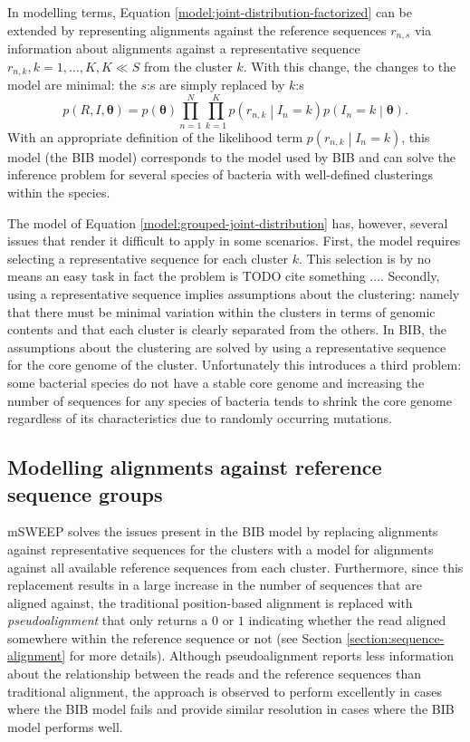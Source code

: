 \documentclass[officiallayout]{tktla}
\begin{document}
In modelling terms, Equation \ref{model:joint-distribution-factorized}
can be extended by representing alignments against the reference
sequences $r_{n, s}$ via information about alignments against a
representative sequence $r_{n, k}, k = 1, \dots, K, K \ll S$ from the
cluster $k$. With this change, the changes to the model are minimal:
the $s$:s are simply replaced by $k$:s
\begin{equation}
  \label{model:grouped-joint-distribution}
  p\left(R, I, \boldsymbol\theta\right) = p\left(\boldsymbol\theta\right)\prod_{n = 1}^{N} \prod_{k = 1}^{K} p\left(r_{n, k} \middle| I_{n} = k\right) p\left(I_{n} = k \middle| \boldsymbol\theta\right).
\end{equation}
With an appropriate definition of the likelihood term $p\left(r_{n, k}
\middle| I_{n} = k\right)$, this model (the BIB model) corresponds
to the model used by BIB and can solve the inference problem for
several species of bacteria with well-defined clusterings within the
species.

The model of Equation \ref{model:grouped-joint-distribution} has,
however, several issues that render it difficult to apply in some
scenarios. First, the model requires selecting a representative
sequence for each cluster $k$. This selection is by no means an easy
task \textemdash in fact the problem is TODO cite something
.... Secondly, using a representative sequence implies assumptions
about the clustering: namely that there must be minimal variation
within the clusters in terms of genomic contents and that each cluster
is clearly separated from the others. In BIB, the assumptions about
the clustering are solved by using a representative sequence for the
core genome of the cluster. Unfortunately this introduces a third
problem: some bacterial species do not have a stable core genome and
increasing the number of sequences for any species of bacteria tends
to shrink the core genome regardless of its characteristics due to
randomly occurring mutations.

\subsection{Modelling alignments against reference sequence groups}

mSWEEP solves the issues present in the BIB model by replacing
alignments against representative sequences for the clusters with a
model for alignments against all available reference sequences from
each cluster. Furthermore, since this replacement results in a large
increase in the number of sequences that are aligned against, the
traditional position-based alignment is replaced with
\textit{pseudoalignment} that only returns a $0$ or $1$ indicating
whether the read aligned somewhere within the reference sequence or
not (see Section \ref{section:sequence-alignment} for more
details). Although pseudoalignment reports less information about the
relationship between the reads and the reference sequences than
traditional alignment, the approach is observed to perform excellently
in cases where the BIB model fails and provide similar resolution in
cases where the BIB model performs well.
\end{document}
